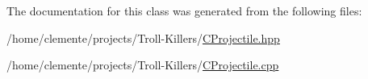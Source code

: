 The documentation for this class was generated from the following files\+:\begin{DoxyCompactItemize}
\item 
/home/clemente/projects/\+Troll-\/\+Killers/\hyperlink{_c_projectile_8hpp}{C\+Projectile.\+hpp}\item 
/home/clemente/projects/\+Troll-\/\+Killers/\hyperlink{_c_projectile_8cpp}{C\+Projectile.\+cpp}\end{DoxyCompactItemize}
